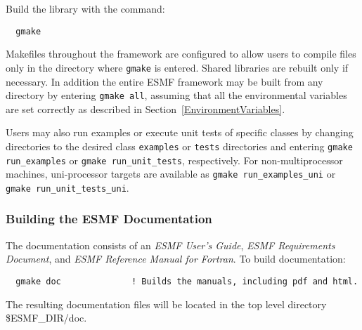 Build the library with the command:
\begin{verbatim}
  gmake 
\end{verbatim}


Makefiles throughout the framework are configured to allow users to
compile files only in the directory where {\tt gmake} is entered. Shared
libraries are rebuilt only if necessary. In addition the entire ESMF
framework may be built from any directory by entering {\tt gmake all},
assuming that all the environmental variables are set correctly as
described in Section~\ref{EnvironmentVariables}.

Users may also run examples or execute unit tests of specific classes
by changing directories to the desired class {\tt examples} or {\tt tests} 
directories and entering {\tt gmake run\_examples} or 
{\tt gmake run\_unit\_tests}, respectively.  For non-multiprocessor machines,
uni-processor targets are available as {\tt gmake run\_examples\_uni} or
{\tt gmake run\_unit\_tests\_uni}.

\subsubsection{Building the ESMF Documentation}
\label{BuildDocumentation}

The documentation consists of an {\it ESMF User's Guide}, 
{\it ESMF Requirements Document}, and 
{\it ESMF Reference Manual for Fortran}.  
\noindent To build documentation:
\begin{verbatim}
  gmake doc              ! Builds the manuals, including pdf and html.
\end{verbatim}

\noindent The resulting documentation files will be
located in the top level directory \${ESMF\_DIR}/doc.



